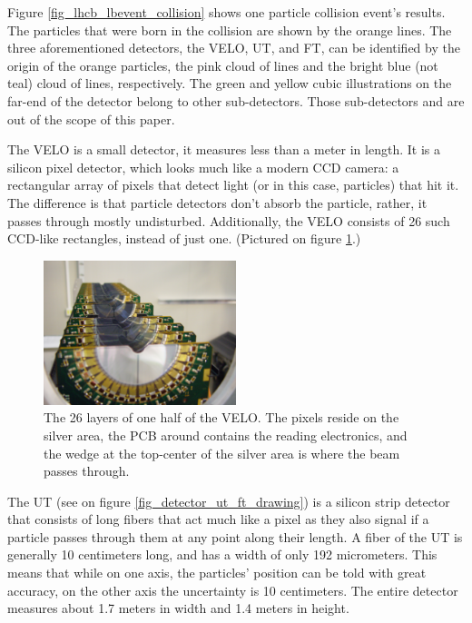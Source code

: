 \documentclass[12pt]{article}
\begin{document}
Figure \ref{fig_lhcb_lbevent_collision} shows one particle collision event's results. The particles that were born in the collision are shown by the orange lines. The three aforementioned detectors, the VELO, UT, and FT, can be identified by the origin of the orange particles, the pink cloud of lines and the bright blue (not teal) cloud of lines, respectively. The green and yellow cubic illustrations on the far-end of the detector belong to other sub-detectors. Those sub-detectors and are out of the scope of this paper.

The VELO is a small detector, it measures less than a meter in length. It is a silicon pixel detector, which looks much like a modern CCD camera: a rectangular array of pixels that detect light (or in this case, particles) that hit it. The difference is that particle detectors don't absorb the particle, rather, it passes through mostly undisturbed. Additionally, the VELO consists of 26 such CCD-like rectangles, instead of just one. (Pictured on figure \ref{fig_detector_velo_real}.)

\begin{figure}[h]
	\begin{center}
		\includegraphics[width=0.5\textwidth]{detector_velo_real}
	\end{center}
	\caption[LHCb's VELO subdetector]{The 26 layers of one half of the VELO. The pixels reside on the silver area, the PCB around contains the reading electronics, and the wedge at the top-center of the silver area is where the beam passes through. \cite{cern_document_server}}
	\label{fig_detector_velo_real}
\end{figure}

The UT (see on figure \ref{fig_detector_ut_ft_drawing}) is a silicon strip detector that consists of long fibers that act much like a pixel as they also signal if a particle passes through them at any point along their length. A fiber of the UT is generally 10 centimeters long, and has a width of only 192 micrometers. This means that while on one axis, the particles' position can be told with great accuracy, on the other axis the uncertainty is 10 centimeters. The entire detector measures about 1.7 meters in width and 1.4 meters in height.
\end{document}

